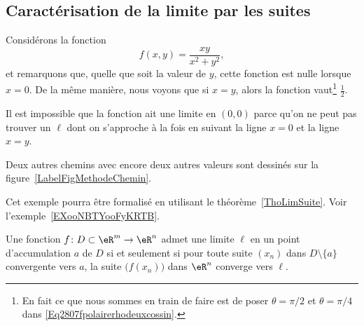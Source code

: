 \subsection{Caractérisation de la limite par les suites}

\begin{example}		\label{ExFNExempleMethodeTrigigi}
	Considérons la fonction
	\begin{equation}
		f(x,y)=\frac{ xy }{ x^2+y^2 },
	\end{equation}
	et remarquons que, quelle que soit la valeur de $y$, cette fonction est nulle lorsque $x=0$. De la même manière, nous voyons que si $x=y$, alors la fonction vaut\footnote{En fait ce que nous sommes en train de faire est de poser $\theta=\pi/2$ et $\theta=\pi/4$ dans \eqref{Eq2807fpolairerhodeuxcossin}.} $\frac{ 1 }{2}$.

	Il est impossible que la fonction ait une limite en $(0,0)$ parce qu'on ne peut pas trouver un $\ell$ dont on s'approche à la fois en suivant la ligne $x=0$ et la ligne $x=y$.

	Deux autres chemins avec encore deux autres valeurs sont dessinés sur la figure~\ref{LabelFigMethodeChemin}.

    Cet exemple pourra être formalisé en utilisant le théorème~\ref{ThoLimSuite}. Voir l'exemple~\ref{EXooNBTYooFyKRTB}.
\end{example}

\begin{theorem}		\label{ThoLimSuite}
	Une fonction $f\colon D\subset\eR^m\to \eR^n$ admet une limite $\ell$ en un point d'accumulation $a$ de $D$ si et seulement si pour toute suite $(x_n)$ dans $D\setminus\{ a \}$ convergente vers $a$, la suite $\big( f(x_n) \big)$ dans $\eR^n$ converge vers $\ell$.
\end{theorem}

